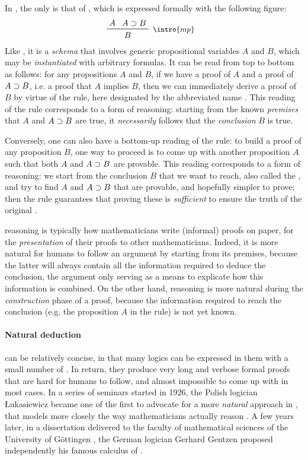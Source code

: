\AP
In , the only  is that of , which is expressed formally with the following figure:
$$\R[\intro{mp}]{A}{A \limp B}{B}$$
Like , it is a \emph{schema} that involves generic propositional variables
$A$ and $B$, which may be \emph{instantiated} with arbitrary formulas. It can be
read from top to bottom as follows: for any propositions $A$ and $B$, if we have
a proof of $A$ and a proof of $A \supset B$, i.e. a proof that $A$ implies $B$,
then we can immediately derive a proof of $B$ by virtue of the rule, here
designated by the abbreviated name . This reading of the rule
corresponds to a form of  reasoning: starting from the known
\emph{premises} that $A$ and $A \supset B$ are true, it \emph{necessarily} follows
that the \emph{conclusion} $B$ is true.

\AP
Conversely, one can also have a bottom-up reading of the rule: to build a proof
of any proposition $B$, one way to proceed is to come up with another
proposition $A$ such that both $A$ and $A \supset B$ are provable. This reading
corresponds to a form of  reasoning: we start from the conclusion
$B$ that we want to reach, also called the , and try to find
 $A$ and $A \supset B$ that are provable, and hopefully simpler to
prove; then the rule guarantees that proving these  is \emph{sufficient}
to ensure the truth of the original .

 reasoning is typically how mathematicians write (informal) proofs on
paper, for the \emph{presentation} of their proofs to other mathematicians.
Indeed, it is more natural for humans to follow an argument by starting from its
premises, because the latter will always contain all the information required to
deduce the conclusion, the argument only serving as a means to explicate how
this information is combined. On the other hand,  reasoning is more
natural during the \emph{construction} phase of a proof, because the information
required to reach the conclusion (e.g. the proposition $A$ in the  rule)
is not yet known.

\paragraph{Natural deduction}

\AP
{} can be relatively concise, in that many logics can be
expressed in them with a small number of . In return, they produce very
long and verbose formal proofs that are hard for humans to follow, and almost
impossible to come up with in most cases. In a series of seminars started in
1926, the Polish logician Łukasiewicz became one of the first to advocate for a
more \emph{natural} approach in , that models more closely the way
mathematicians actually reason . A few years
later, in a dissertation delivered to the faculty of mathematical sciences of
the University of Göttingen , the German
logician Gerhard Gentzen proposed independently his famous calculus of
.

